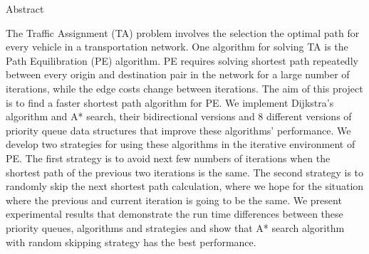 \begin{center}
\Huge Abstract
\end{center}
The Traffic Assignment (TA) problem involves the selection the optimal path for every vehicle in a transportation network.
One algorithm for solving TA is the Path Equilibration (PE) algorithm.
PE requires solving shortest path repeatedly between every origin and destination pair in the network for a large number of iterations, while the edge costs change between iterations.
The aim of this project is to find a faster shortest path algorithm for PE.
We implement Dijkstra's algorithm and A* search, their bidirectional versions and 8 different versions of priority queue data structures that improve these algorithms' performance.
We develop two strategies for using these algorithms in the iterative environment of PE.
The first strategy is to avoid next few numbers of iterations when the shortest path of the previous two iterations is the same.
The second strategy is to randomly skip the next shortest path calculation, where we hope for the situation where the previous and current iteration is going to be the same.
We present experimental results that demonstrate the run time differences between these priority queues, algorithms and strategies and show that A* search algorithm with random skipping strategy has the best performance.
